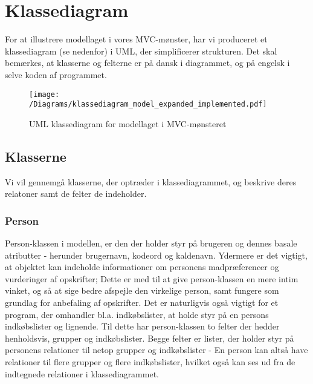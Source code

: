 \chapter{Klassediagram}
For at illustrere modellaget i vores MVC-mønster, har vi produceret et klassediagram (se  nedenfor) i UML, der simplificerer strukturen. 
Det skal bemærkes, at klasserne og felterne er på dansk i diagrammet, og på engelsk i selve koden af programmet. 

\begin{figure}[H]
\centering
\texttt{[image: /Diagrams/klassediagram\_model\_expanded\_implemented.pdf]}
\caption{UML klassediagram for modellaget i MVC-mønsteret}\label{diagram:klassediagram}
\end{figure}

\section{Klasserne}
Vi vil gennemgå klasserne, der optræder i klassediagrammet, og beskrive deres relatoner samt de felter de indeholder.

\subsection{Person}
Person-klassen i modellen, er den der holder styr på brugeren og dennes basale atributter - herunder brugernavn, kodeord og kaldenavn. 
Ydermere er det vigtigt, at objektet kan indeholde informationer om personens madpræferencer og vurderinger af opskrifter;  Dette er med til at give person-klassen en mere intim vinket, og så at sige bedre afspejle den virkelige person, samt fungere som grundlag for anbefaling af opskrifter. 
Det er naturligvis også vigtigt for et program, der omhandler bl.a. indkøbslister, at holde styr på en persons indkøbslister og lignende. 
Til dette har person-klassen to felter der hedder henholdsvis, grupper og indkøbslister. 
Begge felter er lister, der holder styr på personens relationer til netop grupper og indkøbslister - En person kan altså have relationer til flere grupper og flere indkøbslister, hvilket også kan ses ud fra de indtegnede relationer i klassediagrammet.

